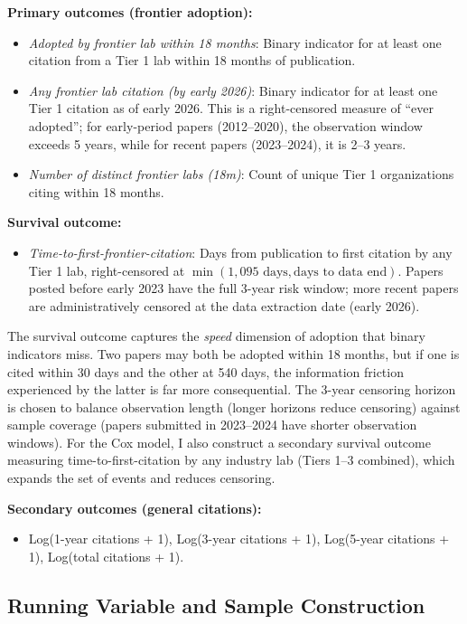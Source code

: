 \documentclass[12pt]{article}
\begin{document}
\textbf{Primary outcomes (frontier adoption):}
\begin{itemize}
    \item \textit{Adopted by frontier lab within 18 months}: Binary indicator for at least one citation from a Tier 1 lab within 18 months of publication.
    \item \textit{Any frontier lab citation (by early 2026)}: Binary indicator for at least one Tier 1 citation as of early 2026. This is a right-censored measure of ``ever adopted''; for early-period papers (2012--2020), the observation window exceeds 5 years, while for recent papers (2023--2024), it is 2--3 years.
    \item \textit{Number of distinct frontier labs (18m)}: Count of unique Tier 1 organizations citing within 18 months.
\end{itemize}

\textbf{Survival outcome:}
\begin{itemize}
    \item \textit{Time-to-first-frontier-citation}: Days from publication to first citation by any Tier 1 lab, right-censored at $\min(1{,}095 \text{ days}, \text{days to data end})$. Papers posted before early 2023 have the full 3-year risk window; more recent papers are administratively censored at the data extraction date (early 2026).
\end{itemize}

\noindent The survival outcome captures the \textit{speed} dimension of adoption that binary indicators miss. Two papers may both be adopted within 18 months, but if one is cited within 30 days and the other at 540 days, the information friction experienced by the latter is far more consequential. The 3-year censoring horizon is chosen to balance observation length (longer horizons reduce censoring) against sample coverage (papers submitted in 2023--2024 have shorter observation windows). For the Cox model, I also construct a secondary survival outcome measuring time-to-first-citation by any industry lab (Tiers 1--3 combined), which expands the set of events and reduces censoring.

\textbf{Secondary outcomes (general citations):}
\begin{itemize}
    \item Log(1-year citations + 1), Log(3-year citations + 1), Log(5-year citations + 1), Log(total citations + 1).
\end{itemize}

\subsection{Running Variable and Sample Construction}
\end{document}
